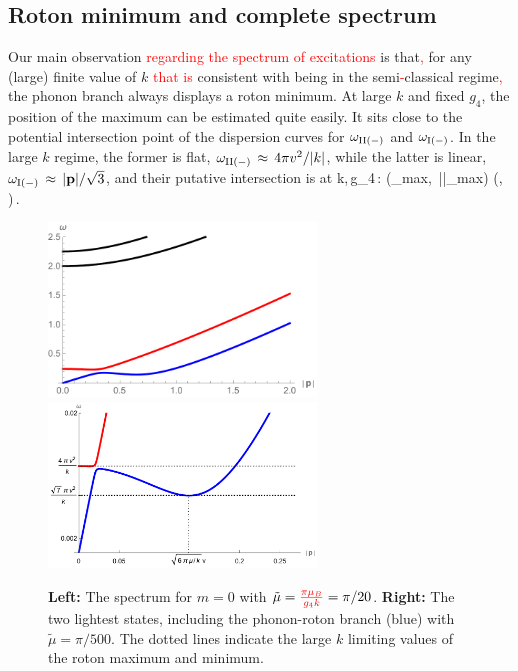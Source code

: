 \subsection{Roton minimum and complete spectrum}
Our main observation \textcolor{red}{regarding the spectrum of excitations} is that\textcolor{red}{,} for any (large) finite value of $k$ \textcolor{red}{that is} consistent with being in the semi\textcolor{red}{-}classical regime\textcolor{red}{,} the phonon branch always displays a roton minimum. 
At large $k$ and fixed $g_4$, the position of the maximum can be estimated quite easily. It sits close to the potential intersection point of the dispersion curves for $\omega_{\rm II(-)}$ and $\omega_{\rm I (-)}$. In the large $k$ regime, the former is flat, $\omega_{\rm II(-)}\,\approx\, 4\pi v^2/|k|$, while the latter is linear, $\omega_{\rm I(-)} \,\approx\, |{\bf p}|/\sqrt{3}$, and their putative intersection is at 
\be
k,\,g_4\,: \qquad \left(\rm \omega_{\rm max},\, |\p|_{\rm max}\right)\,\approx\,\left(, \, \right)\,.
\ee
\begin{figure}[h]
\begin{center}
\includegraphics[width=2.8in]{Chapter_3_Folder_1806.06976/figures/spectrumk20.pdf}\hspace{0.1in}\includegraphics[width=2.8in]{Chapter_3_Folder_1806.06976/figures/rotonk500.pdf}
\end{center}
    \caption[This figure shows the position and heigh of the roton maximum, in addition to the mass of the lowest state for large values of $k$.]{ \small{{\bf Left:} The spectrum for $m=0$ with $\tilde\mu = \textcolor{red}{\frac{\pi \mu_{B}}{g_4 k}} =\pi/20 $. {\bf Right:} The two lightest states, including the phonon-roton branch (blue) with $\tilde\mu=\pi/500$. The dotted lines indicate the large $k$ limiting values of the roton maximum and minimum.
}}
\label{largek}
\end{figure}
